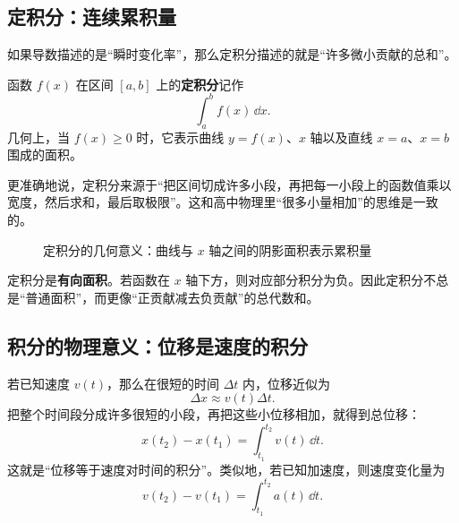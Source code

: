 \subsection{定积分：连续累积量}

如果导数描述的是“瞬时变化率”，那么定积分描述的就是“许多微小贡献的总和”。

\begin{definition}
函数 $f(x)$ 在区间 $[a,b]$ 上的\textbf{定积分}记作
\[
  \int_a^b f(x)\,\dd x.
\]
几何上，当 $f(x)\ge 0$ 时，它表示曲线 $y=f(x)$、$x$ 轴以及直线 $x=a$、$x=b$ 围成的面积。
\end{definition}

更准确地说，定积分来源于“把区间切成许多小段，再把每一小段上的函数值乘以宽度，然后求和，最后取极限”。这和高中物理里“很多小量相加”的思维是一致的。

\begin{figure}[htbp]
  \centering
  \caption{定积分的几何意义：曲线与 $x$ 轴之间的阴影面积表示累积量}
\end{figure}

\begin{remark}
定积分是\textbf{有向面积}。若函数在 $x$ 轴下方，则对应部分积分为负。因此定积分不总是“普通面积”，而更像“正贡献减去负贡献”的总代数和。
\end{remark}

\subsection{积分的物理意义：位移是速度的积分}

若已知速度 $v(t)$，那么在很短的时间 $\Delta t$ 内，位移近似为
\[
  \Delta x \approx v(t)\Delta t.
\]
把整个时间段分成许多很短的小段，再把这些小位移相加，就得到总位移：
\[
  x(t_2)-x(t_1) = \int_{t_1}^{t_2} v(t)\,\dd t.
\]
这就是“位移等于速度对时间的积分”。类似地，若已知加速度，则速度变化量为
\[
  v(t_2)-v(t_1)=\int_{t_1}^{t_2} a(t)\,\dd t.
\]

